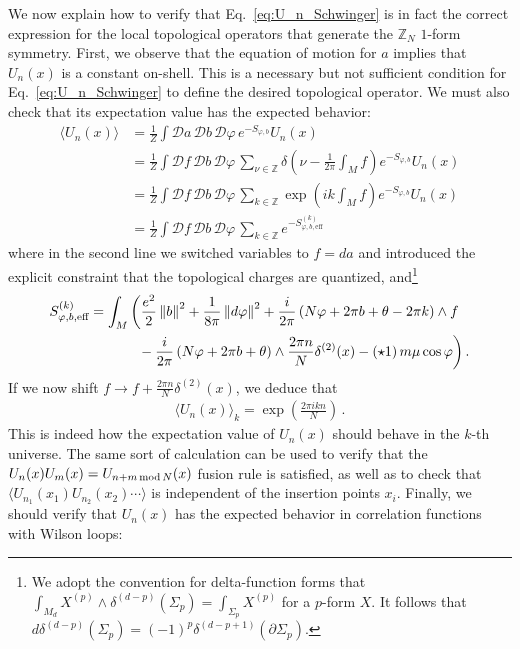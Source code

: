 \documentclass[11pt]{article}
\newcommand{\formabs}[1]{\left\Arrowvert #1 \right\Arrowvert}
\begin{document}
We now explain how to verify that Eq.~\eqref{eq:U_n_Schwinger} is in fact the correct expression for the local topological operators that generate the $\mathbb{Z}_N$ $1$-form symmetry. First, we observe that the equation of motion for $a$ implies that $U_n(x)$ is a constant on-shell.  This is a necessary but not sufficient condition for Eq.~\eqref{eq:U_n_Schwinger} to define the desired topological operator.  We must also check that its expectation value has the expected behavior:
\begin{align}
\langle U_n(x) \rangle &= \frac{1}{Z} \int \mathcal{D} a\, \mathcal{D} b\,\mathcal{D}\varphi \, e^{-S_{\varphi, b}}
 U_n(x)
 \\
&=    \frac{1}{Z} \int \mathcal{D} f\, \mathcal{D} b\,\mathcal{D}\varphi \, \sum_{\nu \in \mathbb{Z}} \delta\left(\nu - \frac{1}{2\pi} \int_{M} f\right) e^{-S_{\varphi,b}}
 U_n(x)
 \\
&=  \frac{1}{Z} \int \mathcal{D} f\, \mathcal{D} b\,\mathcal{D}\varphi \, \sum_{k \in \mathbb{Z}} \exp{\left(i k\int_M f\right)}e^{-S_{\varphi, b}}
 U_n(x) \\
 & =   \frac{1}{Z} \int \mathcal{D} f\, \mathcal{D} b\,\mathcal{D}\varphi \, \sum_{k \in \mathbb{Z}} e^{-S^{(k)}_{\varphi,b,\textrm{eff}}}
  \end{align}
where in the second line we switched variables to $f = da$ and introduced the explicit constraint that the topological charges are quantized, and\footnote{We adopt the convention for delta-function forms that $\int_{M_d} X^{(p)} \wedge \delta^{(d-p)}(\Sigma_p) = \int_{\Sigma_p} X^{(p)}$ for a $p$-form $X$. It follows that $d\delta^{(d-p)}(\Sigma_p) =(-1)^p \delta^{(d-p+1)}(\partial\Sigma_{p})$. }
\begin{align}
S^{(k)}_{\varphi,b,\textrm{eff}} &= \int_M \left( \frac{e^2}{2} \formabs{b}^2+\frac{1}{8\pi} \formabs{d\varphi}^2+\frac{i}{2\pi} \left(N \varphi + 2\pi b + \theta - 2\pi k \right)\wedge f \right.  \nonumber\\
&\left.{\phantom{\frac{e^2}{2} \formabs{b}^2} } -\frac{i}{2\pi} \left(N \varphi + 2\pi b+\theta \right)\wedge \frac{2\pi n}{N} \delta^{(2)}(x) - (\star 1)\, m\mu\cos\varphi \right).
\end{align}
If we now shift $f \to f + \frac{2\pi n}{N} \delta^{(2)}(x)$, we deduce that
\begin{align} 
 \langle U_n(x) \rangle_k = \exp\left( \frac{2\pi i k n}{N} \right) \,.
\end{align}
This is indeed how the expectation value of $U_n(x)$ should behave in the $k$-th universe.  The same sort of calculation can be used to verify that the $U_{n}(x) U_{m}(x) = U_{n+m \textrm{\,mod\,}  N}(x)$ fusion rule is satisfied, as well as to check that $\langle U_{n_1}(x_1) U_{n_2}(x_2) \cdots \rangle$ is independent of the insertion points $x_i$. Finally, we should verify that $U_n(x)$ has the expected behavior in correlation functions with Wilson loops:
\end{document}
